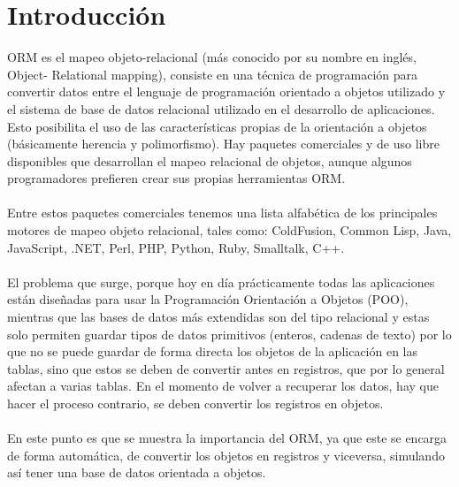 \section{Introducción} 
\begin{flushright}


\begin{itemize}
ORM es el mapeo objeto-relacional (más conocido por su nombre en inglés, Object- Relational mapping), consiste en una técnica de programación para convertir datos entre el lenguaje de programación orientado a objetos utilizado y el sistema de base de datos relacional utilizado en el desarrollo de aplicaciones. Esto posibilita el uso de las características propias de la orientación a objetos (básicamente herencia y polimorfismo). Hay paquetes comerciales y de uso libre disponibles que desarrollan el mapeo relacional de objetos, aunque algunos programadores prefieren crear sus propias herramientas ORM. \textbf{}\\
\textbf{}\\
Entre estos paquetes comerciales tenemos una lista alfabética de los principales motores de mapeo objeto relacional, tales como: ColdFusion, Common Lisp, Java, JavaScript, .NET, Perl, PHP, Python, Ruby, Smalltalk, C++.\textbf{}\\
\textbf{}\\
El problema que surge, porque hoy en día prácticamente todas las aplicaciones están diseñadas para usar la Programación Orientación a Objetos (POO), mientras que las bases de datos más extendidas son del tipo relacional y estas solo permiten guardar tipos de datos primitivos (enteros, cadenas de texto) por lo que no se puede guardar de forma directa los objetos de la aplicación en las tablas, sino que estos se deben de convertir antes en registros, que por lo general afectan a varias tablas. En el momento de volver a recuperar los datos, hay que hacer el proceso contrario, se deben convertir los registros en objetos. \textbf{}\\
\textbf{}\\
En este punto es que se muestra la importancia del ORM, ya que este se encarga de forma automática, de convertir los objetos en registros y viceversa, simulando así tener una base de datos orientada a objetos.




	


\end{itemize} 


\end{flushright}